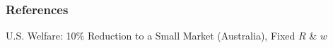 \documentclass[9pt,pdftex,aspectratio=1610]{beamer}
\theoremstyle{definition}
\begin{document}

\appendix

\setcounter{finalframe}{\value{framenumber}}

\begin{frame}[allowframebreaks]
\frametitle{References}
\scriptsize

\end{frame}


\begin{frame}[t]{U.S. Welfare: 10\% Reduction to a Small Market (Australia), {\color{red} Fixed $R$ \& $w$} }
\vspace{-.5cm}
\begin{figure}[!t]
\end{figure}
\end{frame}
\end{document}
